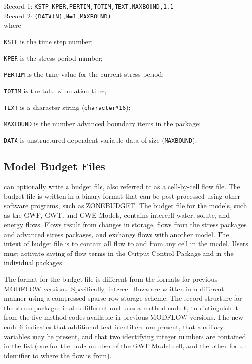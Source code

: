 \vspace{5mm}
\noindent Record 1: \texttt{KSTP,KPER,PERTIM,TOTIM,TEXT,MAXBOUND,1,1} \\
\noindent Record 2: \texttt{(DATA(N),N=1,MAXBOUND)} \\

\vspace{5mm}
\noindent where

\begin{description} \itemsep0pt \parskip0pt 
\item \texttt{KSTP} is the time step number;
\item \texttt{KPER} is the stress period number;
\item \texttt{PERTIM} is the time value for the current stress period; 
\item \texttt{TOTIM} is the total simulation time;
\item \texttt{TEXT} is a character string (\texttt{character*16});
\item \texttt{MAXBOUND} is the number advanced boundary items in the package;
\item \texttt{DATA} is unstructured dependent variable data of size (\texttt{MAXBOUND}).
\end{description}


\newpage
\subsection{Model Budget Files}
\mf can optionally write a budget file, also referred to as a cell-by-cell flow file.  The budget file is written in a binary format that can be post-processed using other software programs, such as ZONEBUDGET.  The budget file for the \mf models, such as the GWF, GWT, and GWE Models, contains intercell water, solute, and energy flows.  Flows result from changes in storage, flows from the stress packages and advanced stress packages, and exchange flows with another model.  The intent of budget file is to contain all flow to and from any cell in the model.  Users must activate saving of flow terms in the Output Control Package and in the individual packages.  

The format for the budget file is different from the formats for previous MODFLOW versions.  Specifically, intercell flows are written in a different manner using a compressed sparse row storage scheme.  The record structure for the stress packages is also different and uses a method code 6, to distinguish it from the five method codes available in previous MODFLOW versions.  The new code 6 indicates that additional text identifiers are present, that auxiliary variables may be present, and that two identifying integer numbers are contained in the list (one for the node number of the GWF Model cell, and the other for an identifier to where the flow is from).  

